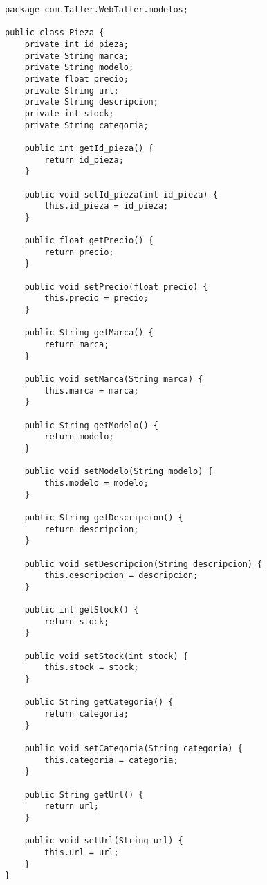 \begin{lstlisting}[caption=Pieza.java (LMSI)]
package com.Taller.WebTaller.modelos;

public class Pieza {
    private int id_pieza;
    private String marca;
    private String modelo;
    private float precio;
    private String url;
    private String descripcion;
    private int stock;
    private String categoria;

    public int getId_pieza() {
        return id_pieza;
    }

    public void setId_pieza(int id_pieza) {
        this.id_pieza = id_pieza;
    }

    public float getPrecio() {
        return precio;
    }

    public void setPrecio(float precio) {
        this.precio = precio;
    }

    public String getMarca() {
        return marca;
    }

    public void setMarca(String marca) {
        this.marca = marca;
    }

    public String getModelo() {
        return modelo;
    }

    public void setModelo(String modelo) {
        this.modelo = modelo;
    }

    public String getDescripcion() {
        return descripcion;
    }

    public void setDescripcion(String descripcion) {
        this.descripcion = descripcion;
    }

    public int getStock() {
        return stock;
    }

    public void setStock(int stock) {
        this.stock = stock;
    }

    public String getCategoria() {
        return categoria;
    }

    public void setCategoria(String categoria) {
        this.categoria = categoria;
    }

    public String getUrl() {
        return url;
    }

    public void setUrl(String url) {
        this.url = url;
    }
}
\end{lstlisting}
\clearpage